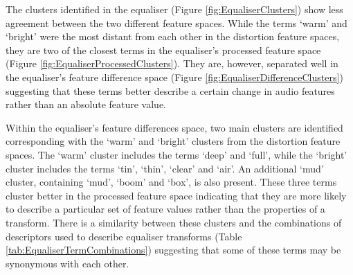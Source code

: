 		The clusters identified in the equaliser (Figure \ref{fig:EqualiserClusters}) show less agreement between
		the two different feature spaces. While the terms `warm' and `bright' were the most distant from each other
		in the distortion feature spaces, they are two of the closest terms in the equaliser's processed feature
		space (Figure \ref{fig:EqualiserProcessedClusters}). They are, however, separated well in the equaliser's
		feature difference space (Figure \ref{fig:EqualiserDifferenceClusters}) suggesting that these terms better
		describe a certain change in audio features rather than an absolute feature value.
		
		Within the equaliser's feature differences space, two main clusters are identified corresponding with the
		`warm' and `bright' clusters from the distortion feature spaces. The `warm' cluster includes the terms
		`deep' and `full', while the `bright' cluster includes the terms `tin', `thin', `clear' and `air'. An
		additional `mud' cluster, containing `mud', `boom' and `box', is also present. These three terms cluster
		better in the processed feature space indicating that they are more likely to describe a particular set of
		feature values rather than the properties of a transform. There is a similarity between these clusters and
		the combinations of descriptors used to describe equaliser transforms (Table
		\ref{tab:EqualiserTermCombinations}) suggesting that some of these terms may be synonymous with each other.

